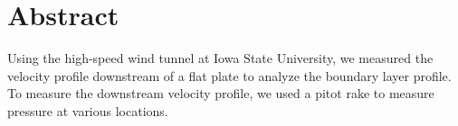\thispagestyle{plain} %



\chapter*{Abstract} %
Using the high-speed wind tunnel at Iowa State University, we measured the velocity profile downstream of a flat plate to analyze the boundary layer profile. To measure the downstream velocity profile, we used a pitot rake to measure pressure at various locations. 



